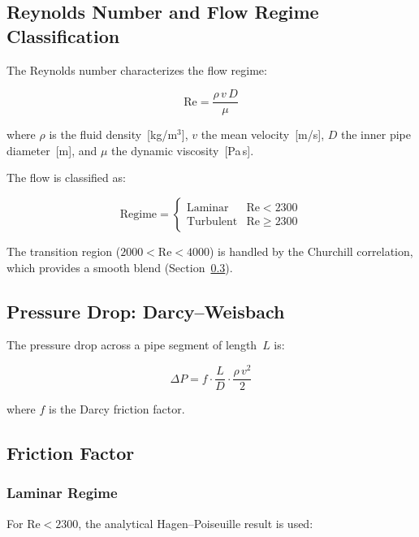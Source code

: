\documentclass[11pt]{article}
\begin{document}
\subsection{Reynolds Number and Flow Regime Classification}

The Reynolds number characterizes the flow regime:

\begin{equation}
  \mathrm{Re} = \frac{\rho \, v \, D}{\mu}
  \label{eq:reynolds}
\end{equation}

where $\rho$ is the fluid density~[kg/m$^3$], $v$ the mean velocity~[m/s],
$D$ the inner pipe diameter~[m], and $\mu$ the dynamic viscosity~[Pa\,s].

The flow is classified as:

\begin{equation}
  \text{Regime} =
  \begin{cases}
    \text{Laminar}    & \mathrm{Re} < 2300 \\
    \text{Turbulent}  & \mathrm{Re} \geq 2300
  \end{cases}
\end{equation}

\noindent
The transition region ($2000 < \mathrm{Re} < 4000$) is handled by the
Churchill correlation, which provides a smooth blend (Section~\ref{sec:friction}).

\subsection{Pressure Drop: Darcy--Weisbach}

The pressure drop across a pipe segment of length~$L$ is:

\begin{equation}
  \Delta P = f \cdot \frac{L}{D} \cdot \frac{\rho \, v^2}{2}
  \label{eq:darcy-weisbach}
\end{equation}

where $f$ is the Darcy friction factor.

\subsection{Friction Factor}
\label{sec:friction}

\subsubsection{Laminar Regime}

For $\mathrm{Re} < 2300$, the analytical Hagen--Poiseuille result is used:
\end{document}
